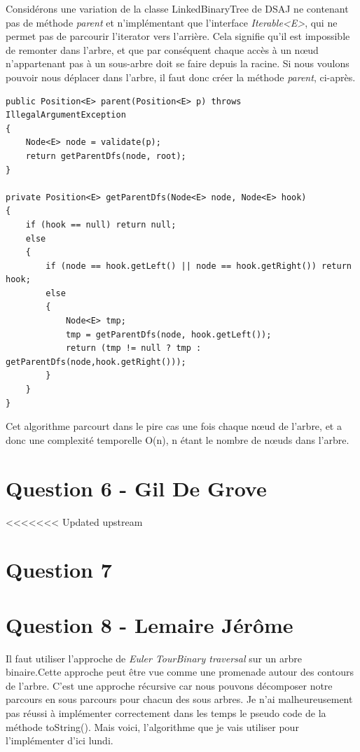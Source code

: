 \documentclass[10pt,a4paper]{article}
\begin{document}
	Considérons une variation de la classe LinkedBinaryTree de DSAJ ne contenant pas de méthode \textit{parent} et n'implémentant que l'interface \textit{Iterable<E>}, qui ne permet pas de parcourir l'iterator vers l'arrière.
	Cela signifie qu'il est impossible de remonter dans l'arbre, et que par conséquent chaque accès à un nœud n'appartenant pas à un sous-arbre doit se faire depuis la racine.
	Si nous voulons pouvoir nous déplacer dans l'arbre, il faut donc créer la méthode \textit{parent}, ci-après.
	
	\begin{lstlisting}
public Position<E> parent(Position<E> p) throws IllegalArgumentException
{
	Node<E> node = validate(p);
	return getParentDfs(node, root);
}

private Position<E> getParentDfs(Node<E> node, Node<E> hook)
{
	if (hook == null) return null;
	else
	{
		if (node == hook.getLeft() || node == hook.getRight()) return hook;
		else
		{
			Node<E> tmp;
			tmp = getParentDfs(node, hook.getLeft());
			return (tmp != null ? tmp : getParentDfs(node,hook.getRight()));
		}
	}
}
	\end{lstlisting}
	
	Cet algorithme parcourt dans le pire cas une fois chaque nœud de l'arbre, et a donc une complexité temporelle O(n), n étant le nombre de nœuds dans l'arbre.

\section*{Question 6 - Gil De Grove}

<<<<<<< Updated upstream
\section*{Question 7}
\section*{Question 8 - Lemaire Jérôme}
Il faut utiliser l'approche de \textit{Euler TourBinary traversal} sur un arbre binaire.Cette approche peut être vue comme une promenade autour des contours de l'arbre. C'est une approche récursive car nous pouvons décomposer notre parcours en sous parcours pour chacun des sous arbres. Je n'ai malheureusement pas réussi à implémenter correctement dans les temps le pseudo code de la méthode toString(). Mais voici, l'algorithme que je vais utiliser pour l'implémenter d'ici lundi.
\end{document}

